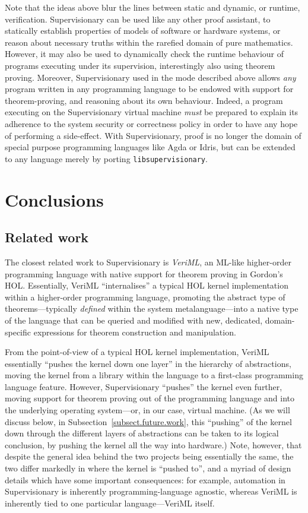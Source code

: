 \documentclass[a4paper, UKenglish, cleveref, autoref, thm-restate, colorlinks]{lipics-v2021}
\begin{document}
Note that the ideas above blur the lines between static and dynamic, or runtime, verification.
Supervisionary can be used like any other proof assistant, to statically establish properties of models of software or hardware systems, or reason about necessary truths within the rarefied domain of pure mathematics.
However, it may also be used to dynamically check the runtime behaviour of programs executing under its supervision, interestingly also using theorem proving.
Moreover, Supervisionary used in the mode described above allows \emph{any} program written in any programming language to be endowed with support for theorem-proving, and reasoning about its own behaviour.
Indeed, a program executing on the Supervisionary virtual machine \emph{must} be prepared to explain its adherence to the system security or correctness policy in order to have any hope of performing a side-effect.
With Supervisionary, proof is no longer the domain of special purpose programming languages like Agda or Idris, but can be extended to any language merely by porting \texttt{libsupervisionary}.

\section{Conclusions}
\label{sect.conclusions}

\subsection{Related work}

The closest related work to Supervisionary is \emph{VeriML}, an ML-like higher-order programming language with native support for theorem proving in Gordon's HOL.
Essentially, VeriML ``internalises'' a typical HOL kernel implementation within a higher-order programming language, promoting the abstract type of theorems---typically \emph{defined} within the system metalanguage---into a native type of the language that can be queried and modified with new, dedicated, domain-specific expressions for theorem construction and manipulation.

From the point-of-view of a typical HOL kernel implementation, VeriML essentially ``pushes the kernel down one layer'' in the hierarchy of abstractions, moving the kernel from a library within the language to a first-class programming language feature.
However, Supervisionary ``pushes'' the kernel even further, moving support for theorem proving out of the programming language and into the underlying operating system---or, in our case, virtual machine.
(As we will discuss below, in Subsection~\ref{subsect.future.work}, this ``pushing'' of the kernel down through the different layers of abstractions can be taken to its logical conclusion, by pushing the kernel all the way into hardware.)
Note, however, that despite the general idea behind the two projects being essentially the same, the two differ markedly in where the kernel is ``pushed to'', and a myriad of design details which have some important consequences: for example, automation in Supervisionary is inherently programming-language agnostic, whereas VeriML is inherently tied to one particular language---VeriML itself.
\end{document}
